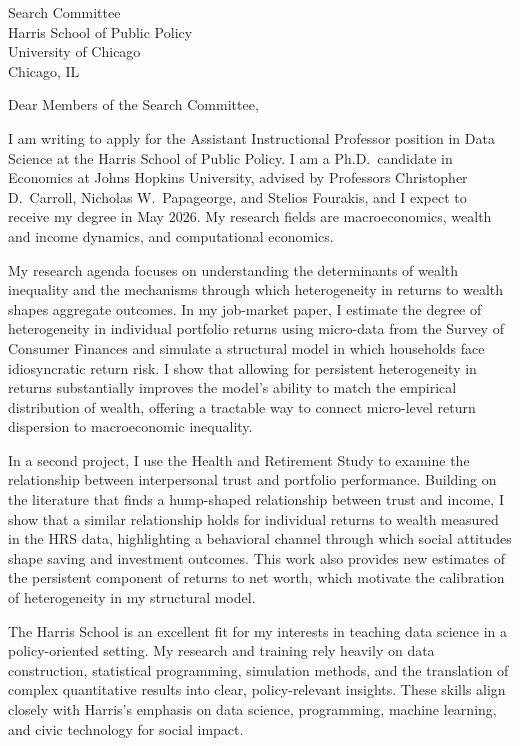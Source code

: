 \documentclass[11pt,letterpaper]{letter}
\begin{document}
\begin{letter}{Search Committee \\
Harris School of Public Policy \\
University of Chicago \\
Chicago, IL}

\opening{Dear Members of the Search Committee,}

I am writing to apply for the Assistant Instructional Professor position in Data Science at the Harris School of Public Policy. I am a Ph.D.\ candidate in Economics at Johns Hopkins University, advised by Professors Christopher D.~Carroll, Nicholas W.~Papageorge, and Stelios Fourakis, and I expect to receive my degree in May 2026. My research fields are macroeconomics, wealth and income dynamics, and computational economics.

My research agenda focuses on understanding the determinants of wealth inequality and the mechanisms through which heterogeneity in returns to wealth shapes aggregate outcomes. In my job-market paper, I estimate the degree of heterogeneity in individual portfolio returns using micro-data from the Survey of Consumer Finances and simulate a structural model in which households face idiosyncratic return risk. I show that allowing for persistent heterogeneity in returns substantially improves the model’s ability to match the empirical distribution of wealth, offering a tractable way to connect micro-level return dispersion to macroeconomic inequality.

In a second project, I use the Health and Retirement Study to examine the relationship between interpersonal trust and portfolio performance. Building on the literature that finds a hump-shaped relationship between trust and income, I show that a similar relationship holds for individual returns to wealth measured in the HRS data, highlighting a behavioral channel through which social attitudes shape saving and investment outcomes. This work also provides new estimates of the persistent component of returns to net worth, which motivate the calibration of heterogeneity in my structural model.

The Harris School is an excellent fit for my interests in teaching data science in a policy-oriented setting. My research and training rely heavily on data construction, statistical programming, simulation methods, and the translation of complex quantitative results into clear, policy-relevant insights. These skills align closely with Harris’s emphasis on data science, programming, machine learning, and civic technology for social impact.


\end{letter}
\end{document}
